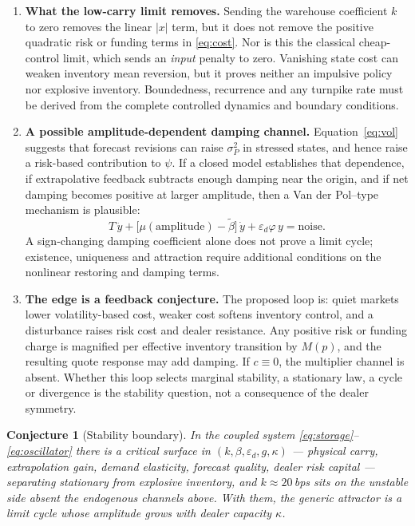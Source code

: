\documentclass[11pt]{article}
\newtheorem{conjecture}{Conjecture}
\begin{document}
\begin{enumerate}[leftmargin=1.5em]
\item \textbf{What the low-carry limit removes.} Sending the warehouse coefficient $k$ to zero removes the linear $|x|$ term, but it does not remove the positive quadratic risk or funding terms in \eqref{eq:cost}. Nor is this the classical cheap-control limit, which sends an \emph{input} penalty to zero. Vanishing state cost can weaken inventory mean reversion, but it proves neither an impulsive policy nor explosive inventory. Boundedness, recurrence and any turnpike rate must be derived from the complete controlled dynamics and boundary conditions.
\item \textbf{A possible amplitude-dependent damping channel.} Equation~\eqref{eq:vol} suggests that forecast revisions can raise $\sigma_P^2$ in stressed states, and hence raise a risk-based contribution to $\psi$. If a closed model establishes that dependence, if extrapolative feedback subtracts enough damping near the origin, and if net damping becomes positive at larger amplitude, then a Van der Pol--type mechanism is plausible:
\begin{equation}
T\,\ddot y + \big[\mu(\text{amplitude})-\tilde\beta\big]\,\dot y
+\varepsilon_d\varphi\,y=\text{noise}.
\label{eq:vdp}
\end{equation}
A sign-changing damping coefficient alone does not prove a limit cycle; existence, uniqueness and attraction require additional conditions on the nonlinear restoring and damping terms.
\item \textbf{The edge is a feedback conjecture.} The proposed loop is: quiet markets lower volatility-based cost, weaker cost softens inventory control, and a disturbance raises risk cost and dealer resistance. Any positive risk or funding charge is magnified per effective inventory transition by $M(p)$, and the resulting quote response may add damping. If $c\equiv0$, the multiplier channel is absent. Whether this loop selects marginal stability, a stationary law, a cycle or divergence is the stability question, not a consequence of the dealer symmetry.
\end{enumerate}

\begin{conjecture}[Stability boundary]\label{conj:boundary}
In the coupled system \eqref{eq:storage}--\eqref{eq:oscillator} there is a critical surface in $(k, \beta, \varepsilon_d, g, \kappa)$ --- physical carry, extrapolation gain, demand elasticity, forecast quality, dealer risk capital --- separating stationary from explosive inventory, and $k \approx 20$\,bps sits on the unstable side \emph{absent} the endogenous channels above. With them, the generic attractor is a limit cycle whose amplitude grows with dealer capacity $\kappa$.
\end{conjecture}
\end{document}
